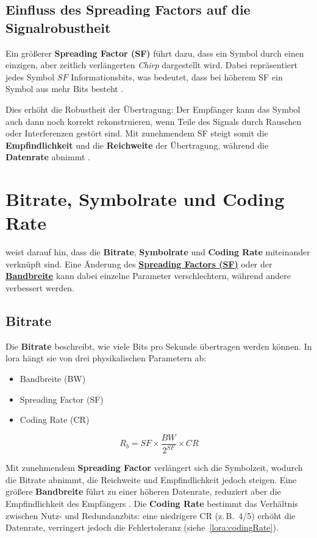 \subsection{Einfluss des Spreading Factors auf die Signalrobustheit}

	Ein grö{\ss}erer \textbf{Spreading Factor (SF)} führt dazu, dass ein Symbol durch einen einzigen, aber zeitlich verlängerten \textit{Chirp} dargestellt wird. Dabei repräsentiert jedes Symbol \(SF\) Informationsbits, was bedeutet, dass bei höherem SF ein Symbol aus mehr Bits besteht \cite{ETSI:2018}. 
	
	Dies erhöht die Robustheit der Übertragung: Der Empfänger kann das Symbol auch dann noch korrekt rekonstruieren, wenn Teile des Signals durch Rauschen oder Interferenzen gestört sind. Mit zunehmendem SF steigt somit die \textbf{Empfindlichkeit} und die \textbf{Reichweite} der Übertragung, während die \textbf{Datenrate} abnimmt \cite{Semtech:2015}. 

\section{Bitrate, Symbolrate und Coding Rate}
	\textcite{Semtech:2015} weist darauf hin, dass die \textbf{Bitrate}, \textbf{Symbolrate} und \textbf{Coding Rate} miteinander verknüpft sind. Eine Änderung des \textbf{\hyperref[lora:sf]{Spreading Factors (SF)}} oder der \textbf{\hyperref[lora:bandWidth]{Bandbreite}} kann dabei einzelne Parameter verschlechtern, während andere verbessert werden.
	
\subsection{Bitrate}
	Die \textbf{Bitrate} beschreibt, wie viele Bits pro Sekunde übertragen werden können. In \ac{lora} hängt sie von drei physikalischen Parametern ab:
	\begin{itemize}
		\item Bandbreite (BW)
		\item Spreading Factor (SF)
		\item Coding Rate (CR)
	\end{itemize}
	
	\[
	R_b = SF \times \frac{BW}{2^{SF}} \times CR
	\]
	
	Mit zunehmendem \textbf{Spreading Factor} verlängert sich die Symbolzeit, wodurch die Bitrate abnimmt, die Reichweite und Empfindlichkeit jedoch steigen. Eine grö{\ss}ere \textbf{Bandbreite} führt zu einer höheren Datenrate, reduziert aber die Empfindlichkeit des Empfängers \cite{Semtech:2024}. Die \textbf{Coding Rate} bestimmt das Verhältnis zwischen Nutz- und Redundanzbits: eine niedrigere CR (z.\,B.\ 4/5) erhöht die Datenrate, verringert jedoch die Fehlertoleranz (siehe~\ref{lora:codingRate}).
	
